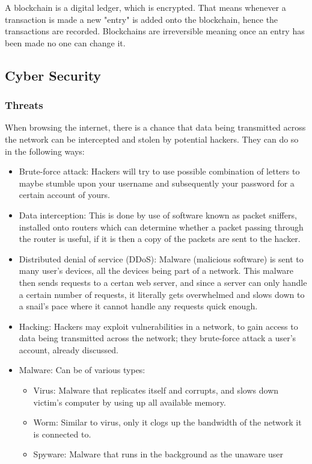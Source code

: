 \documentclass{article}
\begin{document}
A blockchain is a digital ledger, which is encrypted. That means whenever a transaction
is made a new "entry" is added onto the blockchain, hence the transactions are recorded.
Blockchains are irreversible meaning once an entry has been made no one can change it.

\subsection{Cyber Security}
\subsubsection{Threats}
When browsing the internet, there is a chance that data being transmitted across the
network can be intercepted and stolen by potential hackers. They can do so in the 
following ways:
\begin{itemize}
	\item Brute-force attack: Hackers will try to use possible combination of letters
		to maybe stumble upon your username and subsequently your password for a 
		certain account of yours.
	\item Data interception: This is done by use of software known as packet sniffers,
		installed onto routers which can determine whether a packet passing through
		the router is useful, if it is then a copy of the packets are sent to the 
		hacker.
	\item Distributed denial of service (DDoS): Malware (malicious software) is sent to
		many user's devices, all the devices being part of a network. This malware then
		sends requests to a certan web server, and since a server can only handle a 
		certain number of requests, it literally gets overwhelmed and slows down to a
		snail's pace where it cannot handle any requests quick enough.
	\item Hacking: Hackers may exploit vulnerabilities in a network, to gain access to
		data being transmitted across the network; they brute-force attack a user's 
		account, already discussed.
	\item Malware: Can be of various types:
		\begin{itemize}
			\item Virus: Malware that replicates itself and corrupts, and slows down
				victim's computer by using up all available memory.
			\item Worm: Similar to virus, only it clogs up the bandwidth of the network
				it is connected to.
			\item Spyware: Malware that runs in the background as the unaware user

\end{itemize}
\end{itemize}
\end{document}
